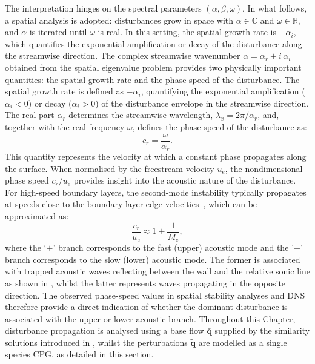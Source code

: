 The interpretation hinges on the spectral parameters $(\alpha,\beta,\omega)$. In what follows, a spatial analysis is adopted: disturbances grow in space with $\alpha \in \mathbb{C}$ and $\omega \in \mathbb{R}$, and $\alpha$ is iterated until $\omega$ is real. In this setting, the spatial growth rate is $-\alpha_i$, which quantifies the exponential amplification or decay of the disturbance along the streamwise direction. The complex streamwise wavenumber $\alpha = \alpha_r + i\,\alpha_i$ obtained from the spatial eigenvalue problem provides two physically important quantities: the spatial growth rate and the phase speed of the disturbance. The spatial growth rate is defined as $-\alpha_i$, quantifying the exponential amplification ($\alpha_i < 0$) or decay ($\alpha_i > 0$) of the disturbance envelope in the streamwise direction. The real part $\alpha_r$ determines the streamwise wavelength, $\lambda_x = 2\pi / \alpha_r$, and, together with the real frequency $\omega$, defines the phase speed of the disturbance as:
\begin{equation}
  c_r = \frac{\omega}{\alpha_r}.
\end{equation}
This quantity represents the velocity at which a constant phase propagates along the surface. When normalised by the freestream velocity $u_e$, the nondimensional phase speed $c_r/u_e$ provides insight into the acoustic nature of the disturbance. For high-speed boundary layers, the second-mode instability typically propagates at speeds close to the boundary layer edge velocities~\citep{Fedorov2011}, which can be approximated as: %
\begin{equation} 
  \frac{c_r}{u_e} \approx 1 \pm \frac{1}{M_e},
\end{equation}
where the `$+$' branch corresponds to the fast (upper) acoustic mode and the '$-$' branch corresponds to the slow (lower) acoustic mode. The former is associated with trapped acoustic waves reflecting between the wall and the relative sonic line as shown in , whilst the latter represents waves propagating in the opposite direction. The observed phase-speed values in spatial stability analyses and \gls{DNS} therefore provide a direct indication of whether the dominant disturbance is associated with the upper or lower acoustic branch. Throughout this Chapter, disturbance propagation is analysed using a base flow $\bar{\boldsymbol{q}}$ supplied by the similarity solutions introduced in , whilst the perturbations $\tilde{\boldsymbol{q}}$ are modelled as a single species \gls{CPG}, as detailed in this section.


